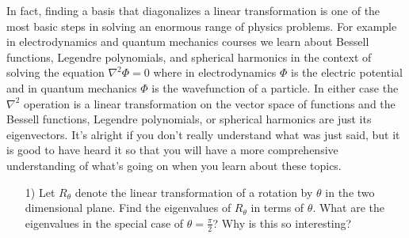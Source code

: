 In fact, finding a basis that diagonalizes a linear transformation is one of the most basic steps in solving an enormous range of physics problems.
For example in electrodynamics and quantum mechanics courses we learn about Bessell functions, Legendre polynomials, and spherical harmonics in the context of solving the equation $\nabla ^2 \Phi = 0$ where in electrodynamics $\Phi$ is the electric potential and in quantum mechanics $\Phi$ is the wavefunction of a particle.
In either case the $\nabla ^2$ operation is a linear transformation on the vector space of functions and the Bessell functions, Legendre polynomials, or spherical harmonics are just its eigenvectors.
It's alright if you don't really understand what was just said, but it is good to have heard it so that you will have a more comprehensive understanding of what's going on when you learn about these topics.

\begin{itemize}
  \item[1)] Let $R_{\theta}$ denote the linear transformation of a rotation by $\theta$ in the two dimensional plane. Find the eigenvalues of $R_{\theta}$ in terms of $\theta$.  What are the eigenvalues in the special case of $\theta = \frac{\pi}{2}$?   Why is this so interesting?
\end{itemize}


